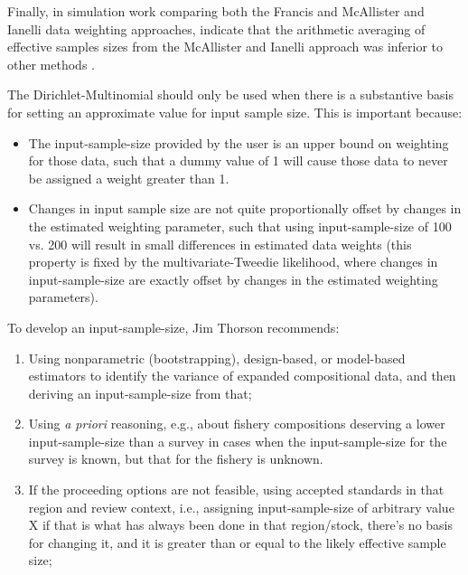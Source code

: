 Finally, in simulation work comparing both the Francis and McAllister and Ianelli data weighting approaches, indicate that the arithmetic averaging of effective samples sizes from the McAllister and Ianelli approach was inferior to other methods \citep{punt_insights_2016}.

\hypertarget{DM}{}

The Dirichlet-Multinomial should only be used when there is a
substantive basis for setting an approximate value for input sample
size.  This is important because: 

\begin{itemize}

\item The input-sample-size provided by the user is an upper bound on
weighting for those data, such that a dummy value of 1 will cause those
data to never be assigned a weight greater than 1.

\item Changes in input sample size are not quite proportionally
offset by changes in the estimated weighting parameter, such that
using input-sample-size of 100 vs. 200 will result in small differences
in estimated data weights (this property is fixed by the
multivariate-Tweedie likelihood, where changes in input-sample-size are
exactly offset by changes in the estimated weighting parameters).   

\end{itemize}

To develop an input-sample-size, Jim Thorson recommends:

\begin{enumerate}

\item Using nonparametric (bootstrapping), design-based, or model-based
estimators to identify the variance of expanded compositional data, and
then deriving an input-sample-size from that; 

\item Using \textit{a priori} reasoning, e.g., about fishery compositions
deserving a lower input-sample-size than a survey in cases when the
input-sample-size for the survey is known, but that for the fishery is
unknown. 

\item If the proceeding options are not feasible, using accepted
standards in that region and review context, i.e., assigning
input-sample-size of arbitrary value X if that is what has always been
done in that region/stock, there's no basis for changing it, and it is
greater than or equal to the likely effective sample size; 

\end{enumerate}

